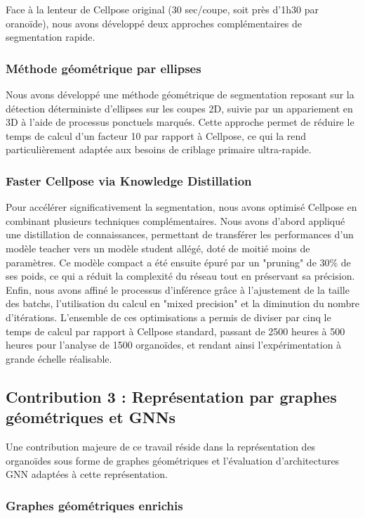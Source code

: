 Face à la lenteur de Cellpose original (30 sec/coupe, soit près d'1h30 par oranoïde), nous avons développé deux approches complémentaires de segmentation rapide.

\subsubsection{Méthode géométrique par ellipses}
Nous avons développé une méthode géométrique de segmentation reposant sur la détection déterministe d'ellipses sur les coupes 2D, suivie par un appariement en 3D à l'aide de processus ponctuels marqués. Cette approche permet de réduire le temps de calcul d'un facteur 10 par rapport à Cellpose, ce qui la rend particulièrement adaptée aux besoins de criblage primaire ultra-rapide.

\subsubsection{Faster Cellpose via Knowledge Distillation}
Pour accélérer significativement la segmentation, nous avons optimisé Cellpose en combinant plusieurs techniques complémentaires. Nous avons d'abord appliqué une distillation de connaissances, permettant de transférer les performances d'un modèle teacher vers un modèle student allégé, doté de moitié moins de paramètres. Ce modèle compact a été ensuite épuré par un "pruning" de 30\% de ses poids, ce qui a réduit la complexité du réseau tout en préservant sa précision. Enfin, nous avons affiné le processus d'inférence grâce à l'ajustement de la taille des batchs, l'utilisation du calcul en "mixed precision" et la diminution du nombre d'itérations. L'ensemble de ces optimisations a permis de diviser par cinq le temps de calcul par rapport à Cellpose standard, passant de 2500 heures à 500 heures pour l'analyse de 1500 organoïdes, et rendant ainsi l'expérimentation à grande échelle réalisable.

\subsection{Contribution 3 : Représentation par graphes géométriques et GNNs}

Une contribution majeure de ce travail réside dans la représentation des organoïdes sous forme de graphes géométriques et l'évaluation d'architectures GNN adaptées à cette représentation.

\subsubsection{Graphes géométriques enrichis}


